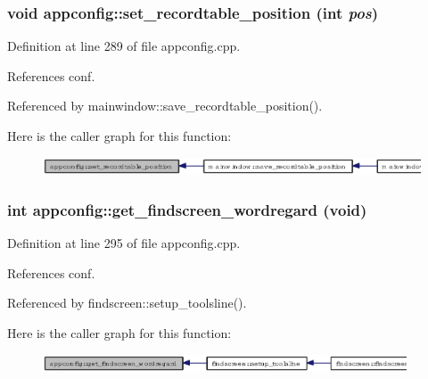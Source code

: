\subsubsection{\setlength{\rightskip}{0pt plus 5cm}void appconfig::set\_\-recordtable\_\-position (int {\em pos})}\label{classappconfig_cad694c68b4fc41283b25be585633069}




Definition at line 289 of file appconfig.cpp.

References conf.

Referenced by mainwindow::save\_\-recordtable\_\-position().

Here is the caller graph for this function:\begin{figure}[H]
\begin{center}
\leavevmode
\includegraphics[width=347pt]{classappconfig_cad694c68b4fc41283b25be585633069_icgraph}
\end{center}
\end{figure}
\subsubsection{\setlength{\rightskip}{0pt plus 5cm}int appconfig::get\_\-findscreen\_\-wordregard (void)}\label{classappconfig_73adc21ab9840f316d9d3750709c193e}




Definition at line 295 of file appconfig.cpp.

References conf.

Referenced by findscreen::setup\_\-toolsline().

Here is the caller graph for this function:\begin{figure}[H]
\begin{center}
\leavevmode
\includegraphics[width=306pt]{classappconfig_73adc21ab9840f316d9d3750709c193e_icgraph}
\end{center}
\end{figure}
